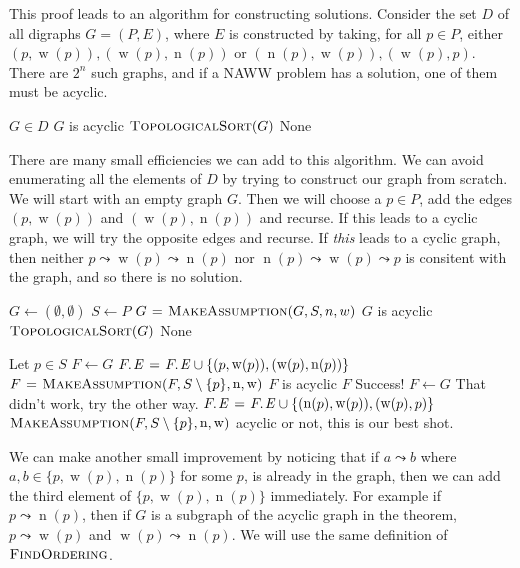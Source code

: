 \documentclass{article}
\DeclareMathOperator{\w}{w}
\DeclareMathOperator{\n}{n}
\begin{document}
This proof leads to an algorithm for constructing solutions. Consider the set $D$ of all digraphs $G=(P,E)$, where $E$ is constructed by taking, for all $p \in P$, either  $(p,\w(p)), (\w(p),\n(p))$ or $(\n(p),\w(p)),(\w(p),p)$. There are $2^n$ such graphs, and if a NAWW problem has a solution, one of them must be acyclic.

\begin{codebox}
\li \For $G\in D$
\li     \Do
        \If $G$ is acyclic
\li         \Do
                \Return $\textnormal{\scshape TopologicalSort}(G)$
        \End
    \End
\li \Return None
\end{codebox}
    
There are many small efficiencies we can add to this algorithm. We can avoid enumerating all the elements of $D$ by trying to construct our graph from scratch. We will start with an empty graph $G$. Then we will choose a $p \in P$, add the edges $(p,\w(p))$ and $(\w(p),\n(p))$ and recurse. If this leads to a cyclic graph, we will try the opposite edges and recurse. If \emph{this} leads to a cyclic graph, then neither $p \leadsto \w(p) \leadsto \n(p)$ nor $\n(p) \leadsto \w(p) \leadsto p$ is consitent with the graph, and so there is no solution.

\begin{codebox}
\li $G \gets (\emptyset, \emptyset)$
\li $S \gets P$
\li $G \mathrel{\hspace{1pt}=\hspace{1pt}} \textnormal{\scshape MakeAssumption}(G,S,n,w)$
\li \If $G$ is acyclic
\li     \Do
        \Return $\textnormal{\scshape TopologicalSort}(G)$
    \End
\li \Return None
\end{codebox}


\begin{codebox}
\Procname{$\proc{MakeAssumption}(G,S,\n,\w)$}
\li Let $p \in S$
\li $F \gets G$
\li $\attrib{F}{E} \gets \attrib{F}{E} \cup \{(p,\w(p)), (\w(p),\n(p))\}$
\li $F \gets \proc{MakeAssumption}(F,S\setminus \{p\}, \n, \w)$
\li \If $F$ is acyclic
\li     \Do
        \Return $F$ \Comment Success!
    \End
\li $F \gets G$ \Comment That didn't work, try the other way.
\li $\attrib{F}{E} \gets \attrib{F}{E} \cup \{(\n(p), \w(p)), (\w(p),p)\}$
\li \Return $\proc{MakeAssumption}(F,S\setminus \{p\}, \n, \w)$ \Comment acyclic or not, this is our best shot.
\end{codebox}

We can make another small improvement by noticing that if $a \leadsto b$ where $a,b \in \{p, \w(p), \n(p)\}$ for some $p$, is already in the graph, then we can add the third element of $\{p, \w(p), \n(p)\}$ immediately. For example if $p \leadsto \n(p)$, then if $G$ is a subgraph of the acyclic graph in the theorem, $p \leadsto \w(p)$ and $\w(p) \leadsto \n(p)$. We will use the same definition of $\textnormal{\scshape FindOrdering}$.
\end{document}
